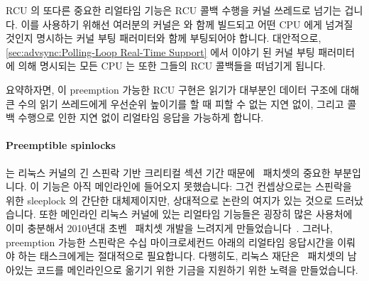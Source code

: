 RCU 의 또다른 중요한 리얼타임 기능은 RCU 콜백 수행을 커널 쓰레드로 넘기는
겁니다.
이를 사용하기 위해선 여러분의 커널은  와 함께
빌드되고 어떤 CPU 에게 넘겨질 것인지 명시하는  커널 부팅
패러미터와 함께 부팅되어야 합니다.
대안적으로,
\cref{sec:advsync:Polling-Loop Real-Time Support} 에서 이야기 된
 커널 부팅 패러미터에 의해 명시되는 모든 CPU 는 또한 그들의 RCU
콜백들을 떠넘기게 됩니다.

요약하자면, 이 preemption 가능한 RCU 구현은 읽기가 대부분인 데이터 구조에 대해
큰 수의 읽기 쓰레드에게 우선순위 높이기를 할 때 피할 수 없는 지연 없이, 그리고
콜백 수행으로 인한 지연 없이 리얼타임 응답을 가능하게 합니다.

\paragraph{Preemptible spinlocks}
는 리눅스 커널의 긴 스핀락 기반 크리티컬 섹션 기간 때문에 \rt\ 패치셋의 중요한
부분입니다.
이 기능은 아직 메인라인에 들어오지 못했습니다: 그건 컨셉상으로는 스핀락을 위한
sleeplock 의 간단한 대체제이지만, 상대적으로 논란의 여지가 있는 것으로
드러났습니다.
또한 메인라인 리눅스 커널에 있는 리얼타임 기능들은 굉장히 많은 사용처에 이미
충분해서 2010년대 초벤 \rt\ 패치셋 개발을 느려지게
만들었습니다~\cite{JakeEdge2013Future-rtLinux,JakeEdge2014Future-rtLinux}.
그러나, preemption 가능한 스핀락은 수십 마이크로세컨드 아래의 리얼타임
응답시간을 이뤄야 하는 태스크에게는 절대적으로 필요합니다.
다행히도, 리눅스 재단은 \rt\ 패치셋의 남아있는 코드를 메인라인으로 옮기기 위한
기금을 지원하기 위한 노력을 만들었습니다.

\iffalse

